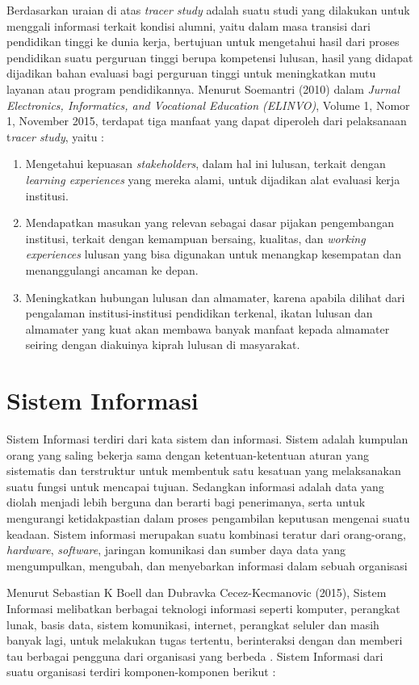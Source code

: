 Berdasarkan uraian di atas \textit{tracer study} adalah suatu studi yang dilakukan untuk menggali informasi terkait kondisi alumni, yaitu dalam masa transisi dari pendidikan tinggi ke dunia kerja, bertujuan untuk mengetahui hasil dari proses pendidikan suatu perguruan tinggi berupa kompetensi lulusan, hasil yang didapat dijadikan bahan evaluasi bagi perguruan tinggi untuk meningkatkan mutu layanan atau program pendidikannya. Menurut Soemantri (2010) dalam \textit{Jurnal Electronics, Informatics, and Vocational Education (ELINVO)}, Volume 1, Nomor 1, November 2015, terdapat tiga manfaat yang dapat diperoleh dari pelaksanaan t\textit{racer study}, yaitu \cite{Nuryake} :
\begin{enumerate}
	\item Mengetahui kepuasan \textit{stakeholders}, dalam hal ini lulusan, terkait dengan \textit{learning experiences} yang mereka alami, untuk dijadikan alat evaluasi kerja institusi.
	\item Mendapatkan masukan yang relevan sebagai dasar pijakan pengembangan institusi, terkait dengan kemampuan bersaing, kualitas, dan \textit{working experiences} lulusan yang bisa digunakan untuk menangkap kesempatan dan menanggulangi ancaman ke depan. 
	\item Meningkatkan hubungan lulusan dan almamater, karena apabila dilihat dari pengalaman institusi-institusi pendidikan terkenal, ikatan lulusan dan almamater yang kuat akan membawa banyak manfaat kepada almamater seiring dengan diakuinya kiprah lulusan di masyarakat. 
\end{enumerate}
	
\section{Sistem Informasi}
Sistem Informasi terdiri dari kata sistem dan informasi. Sistem adalah kumpulan orang yang saling bekerja sama dengan ketentuan-ketentuan aturan yang sistematis dan terstruktur untuk membentuk satu kesatuan yang melaksanakan suatu fungsi untuk mencapai tujuan. Sedangkan informasi adalah data yang diolah menjadi lebih berguna dan berarti bagi penerimanya, serta untuk mengurangi ketidakpastian dalam proses pengambilan keputusan mengenai suatu keadaan. Sistem informasi merupakan suatu kombinasi teratur dari orang-orang, \textit{hardware}, \textit{software}, jaringan komunikasi dan sumber daya data yang mengumpulkan, mengubah, dan menyebarkan informasi dalam sebuah organisasi \cite{Elisabet}

Menurut Sebastian K Boell dan Dubravka Cecez-Kecmanovic (2015), Sistem Informasi melibatkan berbagai teknologi informasi seperti komputer, perangkat lunak, basis data, sistem komunikasi, internet, perangkat seluler dan masih banyak lagi, untuk melakukan tugas tertentu, berinteraksi dengan dan memberi tau berbagai pengguna dari organisasi yang berbeda \cite{Sebastian}. Sistem Informasi dari suatu organisasi terdiri komponen-komponen berikut \cite{Muslihudin} :

